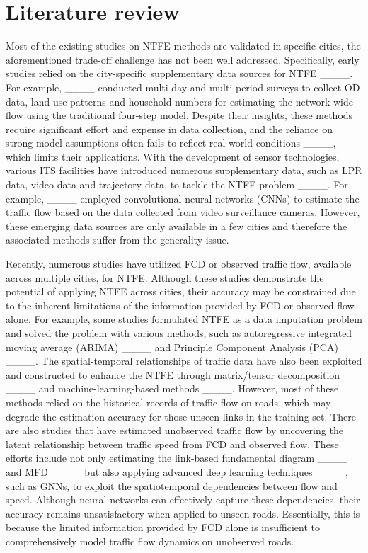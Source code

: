 \section{Literature review}
\label{sec:liter}
Most of the existing studies on NTFE methods are validated in specific cities, the aforementioned trade-off challenge has not been well addressed. Specifically, early studies relied on the city-specific supplementary data sources for NTFE ____. For example, ____ conducted multi-day and multi-period surveys to collect OD data, land-use patterns and household numbers for estimating the network-wide flow using the traditional four-step model. Despite their insights, these methods require significant effort and expense in data collection, and the reliance on strong model assumptions often fails to reflect real-world conditions ____, which limits their applications. With the development of sensor technologies, various ITS facilities have introduced numerous supplementary data, such as LPR data, video data and trajectory data, to tackle the NTFE problem ____. For example, ____ employed convolutional neural networks (CNNs) to estimate the traffic flow based on the data collected from video surveillance cameras. However, these emerging data sources are only available in a few cities and therefore the associated methods suffer from the generality issue.

Recently, numerous studies have utilized FCD or observed traffic flow, available across multiple cities, for NTFE. Although these studies demonstrate the potential of applying NTFE across cities, their accuracy may be constrained due to the inherent limitations of the information provided by FCD or observed flow alone. For example, some studies formulated NTFE as a data imputation problem and solved the problem with various methods, such as autoregressive integrated moving average (ARIMA) ____ and Principle Component Analysis (PCA) ____. The spatial-temporal relationships of traffic data have also been exploited and constructed to enhance the NTFE through matrix/tensor decomposition ____ and machine-learning-based methods ____. However, most of these methods relied on the historical records of traffic flow on roads, which may degrade the estimation accuracy for those unseen links in the training set. There are also studies that have estimated unobserved traffic flow by uncovering the latent relationship between traffic speed from FCD and observed flow. These efforts include not only estimating the link-based fundamental diagram ____ and MFD ____ but also applying advanced deep learning techniques ____, such as GNNs, to exploit the spatiotemporal dependencies between flow and speed. Although neural networks can effectively capture these dependencies, their accuracy remains unsatisfactory when applied to unseen roads. Essentially, this is because the limited information provided by FCD alone is insufficient to comprehensively model traffic flow dynamics on unobserved roads.

